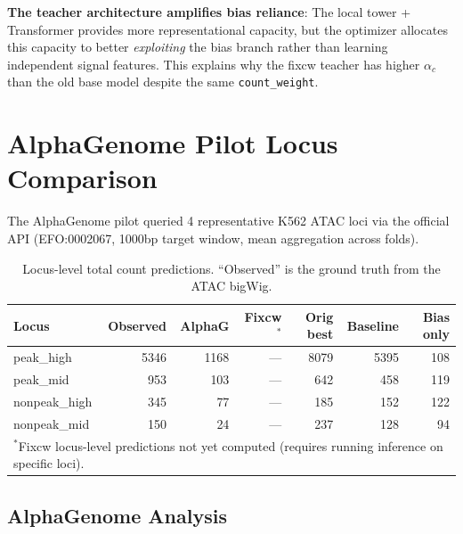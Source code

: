 \documentclass[11pt,a4paper]{article}
\begin{document}
\textbf{The teacher architecture amplifies bias reliance}: The local tower + Transformer provides more representational capacity, but the optimizer allocates this capacity to better \emph{exploiting} the bias branch rather than learning independent signal features. This explains why the fixcw teacher has higher $\alpha_c$ than the old base model despite the same \texttt{count\_weight}.

\section{AlphaGenome Pilot Locus Comparison}
\label{sec:alphagenome}

The AlphaGenome pilot queried 4 representative K562 ATAC loci via the official API (EFO:0002067, 1000bp target window, mean aggregation across folds).

\begin{table}[h]
\centering
\caption{Locus-level total count predictions. ``Observed'' is the ground truth from the ATAC bigWig.}
\label{tab:locus}
\small
\begin{tabular}{l r r r r r r}
\toprule
\textbf{Locus} & \textbf{Observed} & \textbf{AlphaG} & \textbf{Fixcw$^*$} & \textbf{Orig best} & \textbf{Baseline} & \textbf{Bias only} \\
\midrule
peak\_high & 5346 & 1168 & --- & 8079 & 5395 & 108 \\
peak\_mid & 953 & 103 & --- & 642 & 458 & 119 \\
nonpeak\_high & 345 & 77 & --- & 185 & 152 & 122 \\
nonpeak\_mid & 150 & 24 & --- & 237 & 128 & 94 \\
\bottomrule
\multicolumn{7}{l}{\footnotesize $^*$Fixcw locus-level predictions not yet computed (requires running inference on specific loci).}
\end{tabular}
\end{table}

\subsection{AlphaGenome Analysis}
\end{document}
